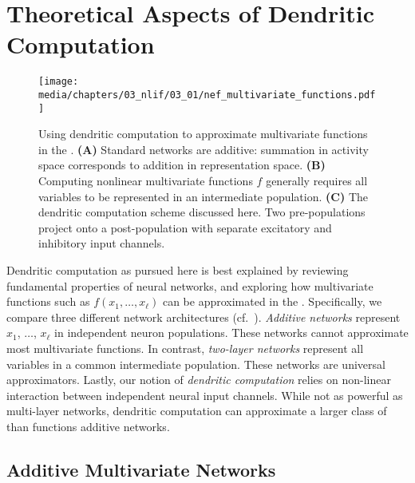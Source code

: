 
\section{Theoretical Aspects of Dendritic Computation}
\label{sec:dendritic_computation_theory}

\begin{figure}
	\centering
	\texttt{[image: media/chapters/03\_nlif/03\_01/nef\_multivariate\_functions.pdf]}%
	{\label{fig:nef_multivariate_functions_a}}%
	{\label{fig:nef_multivariate_functions_b}}%
	{\label{fig:nef_multivariate_functions_c}}%
	\caption[Using dendritic computation to approximate multivariate functions in the NEF]{Using dendritic computation to approximate multivariate functions in the \NEF. \textbf{(A)} Standard \NEF networks are additive: summation in activity space corresponds to addition in representation space.
	\textbf{(B)} Computing nonlinear multivariate functions $f$ generally requires all variables to be represented in an intermediate population.
	\textbf{(C)} The dendritic computation scheme discussed here.
	Two pre-populations project onto a post-population with separate excitatory and inhibitory input channels.
	}
	\label{fig:nef_multivariate_functions}
\end{figure}

Dendritic computation as pursued here is best explained by reviewing fundamental properties of neural networks, and exploring how mul\-ti\-va\-ri\-ate functions such as $f(x_1, \ldots, x_\ell)$ can be approximated in the \NEF.
Specifically, we compare three different network architectures (cf.~).
\emph{Additive networks} represent $x_1$, $\ldots$, $x_\ell$ in independent neuron populations.
These networks cannot approximate most multivariate functions.
In contrast, \emph{two-layer networks} represent all variables in a common intermediate population.
These networks are universal approximators.
Lastly, our notion of \emph{dendritic computation} relies on non-linear interaction between independent neural input channels.
While not as powerful as multi-layer networks, dendritic computation can approximate a larger class of than functions additive networks.

\subsection{Additive Multivariate Networks}
\label{sec:additive_net}

